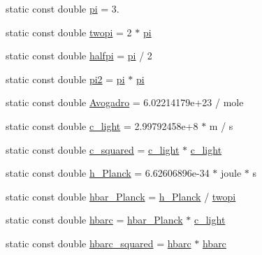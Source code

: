 \begin{DoxyCompactItemize}
\item 
static const double \hyperlink{namespacedd4hep_ae71f82066d68af053eb8f60d0e13d3af}{pi} = 3.
\item 
static const double \hyperlink{namespacedd4hep_ae89c0c70c74b5fd0c1972865846822d7}{twopi} = 2 $\ast$ \hyperlink{namespacedd4hep_ae71f82066d68af053eb8f60d0e13d3af}{pi}
\item 
static const double \hyperlink{namespacedd4hep_a6681c641778caec7c8626e0d666a1be7}{halfpi} = \hyperlink{namespacedd4hep_ae71f82066d68af053eb8f60d0e13d3af}{pi} / 2
\item 
static const double \hyperlink{namespacedd4hep_a5cf56ca6631717191746c4f24418d5f3}{pi2} = \hyperlink{namespacedd4hep_ae71f82066d68af053eb8f60d0e13d3af}{pi} $\ast$ \hyperlink{namespacedd4hep_ae71f82066d68af053eb8f60d0e13d3af}{pi}
\item 
static const double \hyperlink{namespacedd4hep_a674bc3e17add397df97b4b8222ad8a1e}{Avogadro} = 6.\+02214179e+23 / mole
\item 
static const double \hyperlink{namespacedd4hep_abab5bebb73a5c3123d23fba7c326a0d5}{c\+\_\+light} = 2.\+99792458e+8 $\ast$ m / s
\item 
static const double \hyperlink{namespacedd4hep_a1501a5f994e55104b62b1907ff652300}{c\+\_\+squared} = \hyperlink{namespacedd4hep_abab5bebb73a5c3123d23fba7c326a0d5}{c\+\_\+light} $\ast$ \hyperlink{namespacedd4hep_abab5bebb73a5c3123d23fba7c326a0d5}{c\+\_\+light}
\item 
static const double \hyperlink{namespacedd4hep_a673d90bb18d025dec577177927fac9f0}{h\+\_\+\+Planck} = 6.\+62606896e-\/34 $\ast$ joule $\ast$ s
\item 
static const double \hyperlink{namespacedd4hep_abb25342c5e225d62446e9546e412bdcf}{hbar\+\_\+\+Planck} = \hyperlink{namespacedd4hep_a673d90bb18d025dec577177927fac9f0}{h\+\_\+\+Planck} / \hyperlink{namespacedd4hep_ae89c0c70c74b5fd0c1972865846822d7}{twopi}
\item 
static const double \hyperlink{namespacedd4hep_aee6340c5f86bb7ae1edcc2a90efa056e}{hbarc} = \hyperlink{namespacedd4hep_abb25342c5e225d62446e9546e412bdcf}{hbar\+\_\+\+Planck} $\ast$ \hyperlink{namespacedd4hep_abab5bebb73a5c3123d23fba7c326a0d5}{c\+\_\+light}
\item 
static const double \hyperlink{namespacedd4hep_acf9f3f7006e079db9d63413e8c861d94}{hbarc\+\_\+squared} = \hyperlink{namespacedd4hep_aee6340c5f86bb7ae1edcc2a90efa056e}{hbarc} $\ast$ \hyperlink{namespacedd4hep_aee6340c5f86bb7ae1edcc2a90efa056e}{hbarc}
\item 

\end{DoxyCompactItemize}
